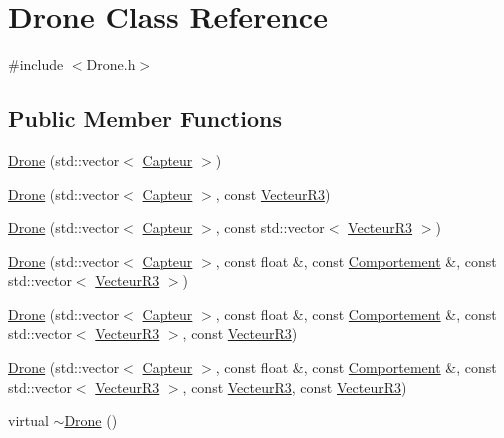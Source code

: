 \hypertarget{class_drone}{}\section{Drone Class Reference}
\label{class_drone}


{\ttfamily \#include $<$Drone.\+h$>$}

\subsection*{Public Member Functions}
\begin{DoxyCompactItemize}
\item 
\mbox{\hyperlink{class_drone_add4812090fe80b1beb2eade5dedc20ce}{Drone}} (std\+::vector$<$ \mbox{\hyperlink{class_capteur}{Capteur}} $>$)
\item 
\mbox{\hyperlink{class_drone_aa48e4bdade6c74bee3135dcbeb63a564}{Drone}} (std\+::vector$<$ \mbox{\hyperlink{class_capteur}{Capteur}} $>$, const \mbox{\hyperlink{class_vecteur_r3}{Vecteur\+R3}})
\item 
\mbox{\hyperlink{class_drone_a5a19cc2f816b25fb30687ac2411ba838}{Drone}} (std\+::vector$<$ \mbox{\hyperlink{class_capteur}{Capteur}} $>$, const std\+::vector$<$ \mbox{\hyperlink{class_vecteur_r3}{Vecteur\+R3}} $>$)
\item 
\mbox{\hyperlink{class_drone_a38da96f40b761385be1ad4a793fc037e}{Drone}} (std\+::vector$<$ \mbox{\hyperlink{class_capteur}{Capteur}} $>$, const float \&, const \mbox{\hyperlink{class_comportement}{Comportement}} \&, const std\+::vector$<$ \mbox{\hyperlink{class_vecteur_r3}{Vecteur\+R3}} $>$)
\item 
\mbox{\hyperlink{class_drone_a83d355f173a1a04e464a6e1037398376}{Drone}} (std\+::vector$<$ \mbox{\hyperlink{class_capteur}{Capteur}} $>$, const float \&, const \mbox{\hyperlink{class_comportement}{Comportement}} \&, const std\+::vector$<$ \mbox{\hyperlink{class_vecteur_r3}{Vecteur\+R3}} $>$, const \mbox{\hyperlink{class_vecteur_r3}{Vecteur\+R3}})
\item 
\mbox{\hyperlink{class_drone_a88bd36472815a6369e33eb206acd1543}{Drone}} (std\+::vector$<$ \mbox{\hyperlink{class_capteur}{Capteur}} $>$, const float \&, const \mbox{\hyperlink{class_comportement}{Comportement}} \&, const std\+::vector$<$ \mbox{\hyperlink{class_vecteur_r3}{Vecteur\+R3}} $>$, const \mbox{\hyperlink{class_vecteur_r3}{Vecteur\+R3}}, const \mbox{\hyperlink{class_vecteur_r3}{Vecteur\+R3}})
\item 
virtual \mbox{\hyperlink{class_drone_a667075abb1eb5c54be6418884a387d14}{$\sim$\+Drone}} ()

\end{DoxyCompactItemize}
